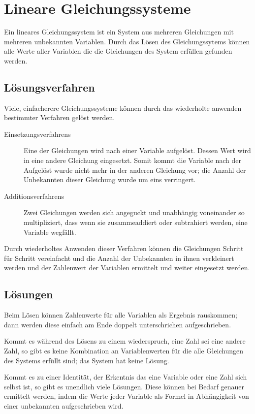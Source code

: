 \documentclass{article}
\begin{document}
\section{Lineare Gleichungssysteme} 
Ein lineares Gleichungssystem ist ein System aus mehreren Gleichungen mit mehreren unbekannten Variablen. Durch das Lösen des Gleichungssytems können alle Werte aller Variablen die die Gleichungen des System erfüllen gefunden werden.

\subsection{Lösungsverfahren}
Viele, einfacherere Gleichungssysteme können durch das wiederholte anwenden bestimmter Verfahren gelöst werden.
\begin{description}
  \item[Einsetzungsverfahrens] Eine der Gleichungen wird nach einer Variable aufgelöst. Dessen Wert wird in eine andere Gleichung eingesetzt. Somit kommt die Variable nach der Aufgelöst wurde nicht mehr in der anderen Gleichung vor; die Anzahl der Unbekannten dieser Gleichung wurde um eins verringert.
  \item[Additionsverfahrens] Zwei Gleichungen werden sich angeguckt und unabhängig voneinander so multipliziert, dass wenn sie zusammeaddiert oder subtrahiert werden, eine Variable wegfällt. 
\end{description}
Durch wiederholtes Anwenden dieser Verfahren können die Gleichungen Schritt für Schritt vereinfacht und die Anzahl der Unbekannten in ihnen verkleinert werden und der Zahlenwert der Variablen ermittelt und weiter eingesetzt werden. 

\subsection{Lösungen}
Beim Lösen können Zahlenwerte für alle Variablen als Ergebnis rauskommen; dann werden diese einfach am Ende doppelt unterschrichen aufgeschrieben.

Kommt es während des Lösens zu einem wiederspruch, \zb eine Zahl sei eine andere Zahl, so gibt es keine Kombination an Variablenwerten für die alle Gleichungen des Systems erfüllt sind; das System hat keine Lösung.

Kommt es zu einer Identität, der Erkentnis das eine Variable oder eine Zahl sich selbst ist, so gibt es unendlich viele Lösungen. Diese können bei Bedarf genauer ermittelt werden, indem die Werte jeder Variable als Formel in Abhängigkeit von einer unbekannten aufgeschrieben wird.  
\end{document}
